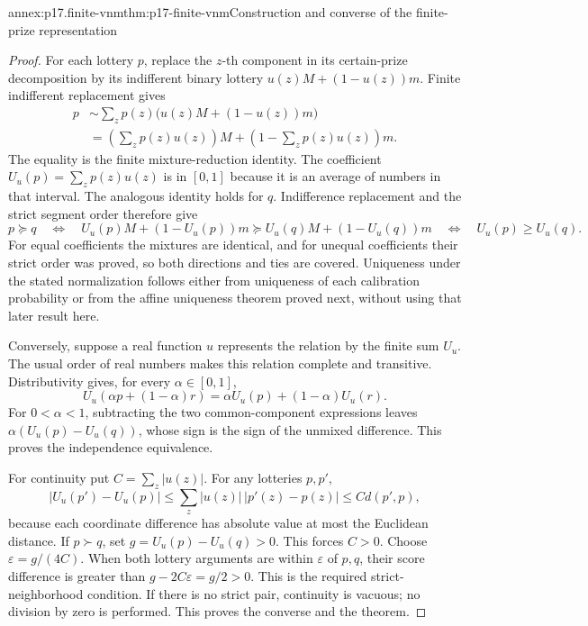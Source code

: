 \begin{annexitem}{annex:p17.finite-vnm}{thm:p17-finite-vnm}{Construction and converse of the finite-prize representation}
\begin{proof}
For each lottery \(p\), replace the \(z\)-th component in its certain-prize
decomposition by its indifferent binary lottery
\(u(z)M+(1-u(z))m\). Finite indifferent replacement gives
\[
\begin{aligned}
 p&\sim\sum_zp(z)\bigl(u(z)M+(1-u(z))m\bigr)\\
  &=\left(\sum_zp(z)u(z)\right)M
          +\left(1-\sum_zp(z)u(z)\right)m.
\end{aligned}
\]
The equality is the finite mixture-reduction identity. The coefficient
\(U_u(p)=\sum_zp(z)u(z)\) is in \([0,1]\) because it is an average
of numbers in that interval. The analogous identity holds for \(q\).
Indifference replacement and the strict segment order therefore give
\[
 p\succeq q
  \quad\Longleftrightarrow\quad
  U_u(p)M+(1-U_u(p))m\succeq U_u(q)M+(1-U_u(q))m
  \quad\Longleftrightarrow\quad U_u(p)\geq U_u(q).
\]
For equal coefficients the mixtures are identical, and for unequal
coefficients their strict order was proved, so both directions and ties
are covered. Uniqueness under the stated normalization follows either
from uniqueness of each calibration probability or from the affine
uniqueness theorem proved next, without using that later result here.

Conversely, suppose a real function \(u\) represents the relation by
the finite sum \(U_u\). The usual order of real numbers makes this
relation complete and transitive. Distributivity gives, for every
\(\alpha\in[0,1]\),
\[
 U_u(\alpha p+(1-\alpha)r)=\alpha U_u(p)+(1-\alpha)U_u(r).
\]
For \(0<\alpha<1\), subtracting the two common-component expressions
leaves \(\alpha(U_u(p)-U_u(q))\), whose sign is the sign of the
unmixed difference. This proves the independence equivalence.

For continuity put \(C=\sum_z|u(z)|\). For any lotteries \(p,p'\),
\[
 |U_u(p')-U_u(p)|
   \leq\sum_z|u(z)|\,|p'(z)-p(z)|
   \leq C d(p',p),
\]
because each coordinate difference has absolute value at most the
Euclidean distance. If \(p\succ q\), set
\(g=U_u(p)-U_u(q)>0\). This forces \(C>0\). Choose
\(\varepsilon=g/(4C)\). When both lottery arguments are within
\(\varepsilon\) of \(p,q\), their score difference is greater than
\(g-2C\varepsilon=g/2>0\). This is the required strict-neighborhood
condition. If there is no strict pair, continuity is vacuous; no division
by zero is performed. This proves the converse and the theorem.
\end{proof}
\end{annexitem}

